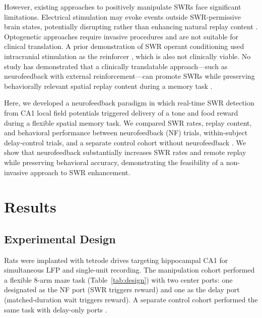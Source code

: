 \documentclass[11pt]{article}
\begin{document}
However, existing approaches to positively manipulate SWRs face significant limitations. Electrical stimulation may evoke events outside SWR-permissive brain states, potentially disrupting rather than enhancing natural replay content \citep{logothetis2012}. Optogenetic approaches require invasive procedures and are not suitable for clinical translation. A prior demonstration of SWR operant conditioning used intracranial stimulation as the reinforcer \citep{ishikawa2014}, which is also not clinically viable. No study has demonstrated that a clinically translatable approach---such as neurofeedback with external reinforcement---can promote SWRs while preserving behaviorally relevant spatial replay content during a memory task \citep{sitaram2017}.

Here, we developed a neurofeedback paradigm in which real-time SWR detection from CA1 local field potentials triggered delivery of a tone and food reward during a flexible spatial memory task. We compared SWR rates, replay content, and behavioral performance between neurofeedback (NF) trials, within-subject delay-control trials, and a separate control cohort without neurofeedback \citep{gillespie2021}. We show that neurofeedback substantially increases SWR rates and remote replay while preserving behavioral accuracy, demonstrating the feasibility of a non-invasive approach to SWR enhancement.

\section{Results}

\subsection{Experimental Design}

Rats were implanted with tetrode drives targeting hippocampal CA1 for simultaneous LFP and single-unit recording. The manipulation cohort performed a flexible 8-arm maze task (Table~\ref{tab:design}) with two center ports: one designated as the NF port (SWR triggers reward) and one as the delay port (matched-duration wait triggers reward). A separate control cohort performed the same task with delay-only ports \citep{gillespie2021}.
\end{document}
